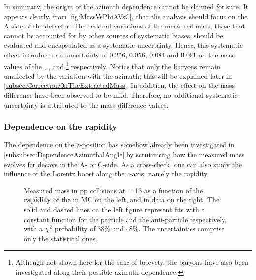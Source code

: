 In summary, the origin of the azimuth dependence cannot be claimed for sure. It appears clearly, from \figs\ref{fig:MassVsPhiAVsC}, that the analysis should focus on the A-side of the detector. The residual variations of the measured mass, those that cannot be accounted for by other sources of systematic biases, should be evaluated and encapsulated as a systematic uncertainty. Hence, this systematic effect introduces an uncertainty of 0.256, 0.056, 0.084 and 0.081 \mmass on the mass values of the \rmKzeroS, \rmLambdaPM, \rmOmegaM and \rmAomegaP\footnote{Although not shown here for the sake of brievety, the \rmOmegaPM baryons have also been investigated along their possible azimuth dependence.} respectively. Notice that only the \rmXi baryons remain  unaffected by the variation with the azimuth; this will be explained later in \Sec\ref{subsec:CorrectionOnTheExtractedMass}. In addition, the effect on the mass difference have been observed to be mild. Therefore, no additional systematic uncertainty is attributed to the mass difference values.

\subsubsection{Dependence on the rapidity}
\label{subsubsec:RapidityDependence}

The dependence on the $z$-position has somehow already been investigated in \Sec\ref{subsubsec:DependenceAzimuthalAngle} by scrutinising how the measured mass evolves for decays in the A- or C-side. As a cross-check, one can also study the influence of the Lorentz boost along the $z$-axis, namely the rapidity.

\begin{figure}[h]
\hspace*{-1.5cm}
\caption{Measured mass in pp collisions at \sqrtS = 13 \tev as a function of the \textbf{rapidity} of the \rmLambda in MC on the left, and in data on the right. The solid and dashed lines on the left figure represent fits with a constant function for the particle and the anti-particle respectively, with a $\chi^{2}$ probability of 38\% and 48\%. The uncertainties comprise only the statistical ones.}
	\label{fig:MassVsRap}
\end{figure}

